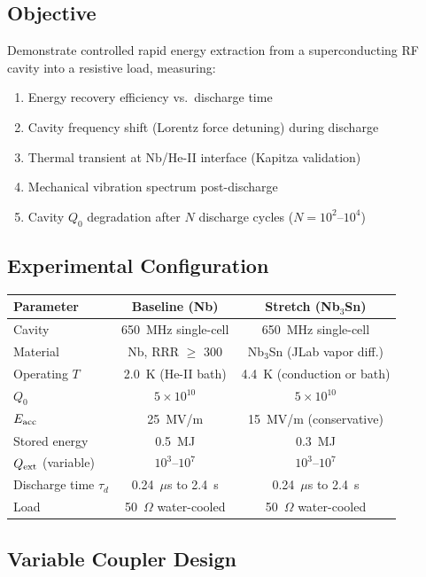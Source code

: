 \documentclass[11pt]{article}
\newcommand{\ee}[1]{\times 10^{#1}}
\begin{document}
\subsection{Objective}

Demonstrate controlled rapid energy extraction from a superconducting
RF cavity into a resistive load, measuring:
\begin{enumerate}[nosep]
  \item Energy recovery efficiency vs.\ discharge time
  \item Cavity frequency shift (Lorentz force detuning) during discharge
  \item Thermal transient at Nb/He-II interface (Kapitza validation)
  \item Mechanical vibration spectrum post-discharge
  \item Cavity $Q_0$ degradation after $N$ discharge cycles ($N = 10^2$--$10^4$)
\end{enumerate}

\subsection{Experimental Configuration}

\begin{center}
\begin{tabular}{lcc}
\toprule
Parameter & Baseline (Nb) & Stretch (Nb$_3$Sn) \\
\midrule
Cavity & 650~MHz single-cell & 650~MHz single-cell \\
Material & Nb, RRR $\geq$ 300 & Nb$_3$Sn (JLab vapor diff.) \\
Operating $T$ & 2.0~K (He-II bath) & 4.4~K (conduction or bath) \\
$Q_0$ & $5\ee{10}$ & $5\ee{10}$ \\
$E_{\rm acc}$ & 25~MV/m & 15~MV/m (conservative) \\
Stored energy & 0.5~MJ & 0.3~MJ \\
$Q_{\rm ext}$ (variable) & $10^3$--$10^7$ & $10^3$--$10^7$ \\
Discharge time $\tau_d$ & 0.24~$\mu$s to 2.4~s & 0.24~$\mu$s to 2.4~s \\
Load & 50~$\Omega$ water-cooled & 50~$\Omega$ water-cooled \\
\bottomrule
\end{tabular}
\end{center}

\subsection{Variable Coupler Design}
\end{document}

